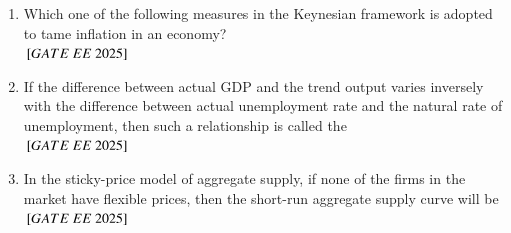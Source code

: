 \documentclass[journal,12pt,onecolumn]{IEEEtran}
\theoremstyle{remark}
\begin{document}
\begin{enumerate}
    \item Which one of the following measures in the Keynesian framework is adopted to tame inflation in an economy? \\
    \hfill $\sbrak{GATE\ EE\ 2025}$

    \begin{enumerate}
      \end{enumerate}

    \item If the difference between actual GDP and the trend output varies inversely with the difference between actual unemployment rate and the natural rate of unemployment, then such a relationship is called the\\      \hfill $\sbrak{GATE\ EE\ 2025}$
    \begin{enumerate}
      \end{enumerate}

    \item In the sticky-price model of aggregate supply, if none of the firms in the market have flexible prices, then the short-run aggregate supply curve will be
     \hfill $\sbrak{GATE\ EE\ 2025}$
    \begin{enumerate}
        \begin{multicols}{2}


\end{multicols}
\end{enumerate}
\end{enumerate}
\end{document}
